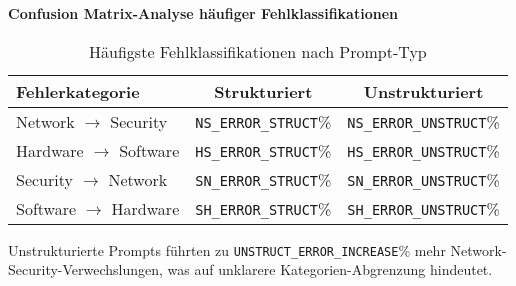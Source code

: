 \textbf{Confusion Matrix-Analyse häufiger Fehlklassifikationen}\\
\begin{table}[h!]
\centering
\caption{Häufigste Fehlklassifikationen nach Prompt-Typ}
\label{tab:error-patterns}
\small
\begin{tabular}{@{}lcc@{}}
\toprule
\textbf{Fehlerkategorie} & \textbf{Strukturiert} & \textbf{Unstrukturiert} \\
\midrule
Network $\rightarrow$ Security & \texttt{NS\_ERROR\_STRUCT}\% & \texttt{NS\_ERROR\_UNSTRUCT}\% \\
Hardware $\rightarrow$ Software & \texttt{HS\_ERROR\_STRUCT}\% & \texttt{HS\_ERROR\_UNSTRUCT}\% \\
Security $\rightarrow$ Network & \texttt{SN\_ERROR\_STRUCT}\% & \texttt{SN\_ERROR\_UNSTRUCT}\% \\
Software $\rightarrow$ Hardware & \texttt{SH\_ERROR\_STRUCT}\% & \texttt{SH\_ERROR\_UNSTRUCT}\% \\
\bottomrule
\end{tabular}
\end{table}

Unstrukturierte Prompts führten zu \texttt{UNSTRUCT\_ERROR\_INCREASE}\% mehr Network-Security-Verwechslungen, was auf unklarere Kategorien-Abgrenzung hindeutet.


